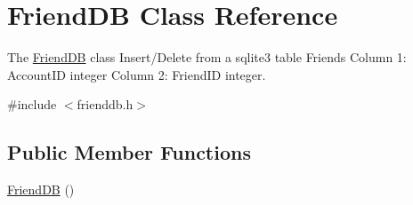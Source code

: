 \hypertarget{classFriendDB}{}\section{Friend\+DB Class Reference}
\label{classFriendDB}


The \hyperlink{classFriendDB}{Friend\+DB} class Insert/\+Delete from a sqlite3 table Friends Column 1\+: Account\+ID integer Column 2\+: Friend\+ID integer.  




{\ttfamily \#include $<$frienddb.\+h$>$}

\subsection*{Public Member Functions}
\begin{DoxyCompactItemize}
\item 
\hyperlink{classFriendDB_a6fd7410c33c662d8b78da820857d24ac}{Friend\+DB} ()\hypertarget{classFriendDB_a6fd7410c33c662d8b78da820857d24ac}{}\label{classFriendDB_a6fd7410c33c662d8b78da820857d24ac}


\end{DoxyCompactItemize}

